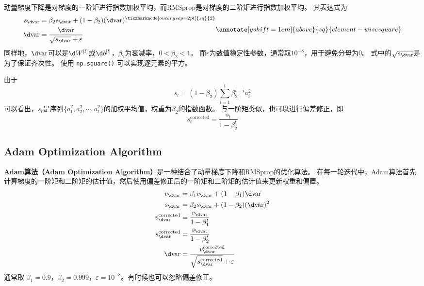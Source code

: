 动量梯度下降是对梯度的一阶矩进行指数加权平均，而RMSprop是对梯度的二阶矩进行指数加权平均。
其表达式为
\begin{equation}
    \begin{aligned}
        s_{\d \mathrm{var}} &= \beta_2 s_{\d \mathrm{var}} + (1 - \beta_2)(\d \mathrm{var})^{\tikzmarknode[outer ysep=2pt]{sq}{2}} \\
        \d \mathrm{var} &= \frac{\d \mathrm{var}}{\sqrt{s_{\d \mathrm{var}}} + \varepsilon}
    \end{aligned}
    \annotate[yshift=1em]{above}{sq}{element-wise square}
    \label{eq:rmsprop}
\end{equation}
同样地，$\d \mathrm{var}$可以是$\d W^{[l]}$或$\d b^{[l]}$，$\beta_2$为衰减率，$0 < \beta_2 < 1$。
而$\varepsilon$为数值稳定性参数，通常取$10^{-8}$，用于避免分母为0。
式中的$\sqrt{s_{\d \mathrm{var}}}$是为了保证齐次性。
使用 \verb|np.square()| 可以实现逐元素的平方。

由于
\begin{equation}
    s_t = (1 - \beta_2)\sum_{i=1}^t\beta_2^{t-i}a_i^2
\end{equation}
可以看出，$s_t$是序列$\{a_1^2, a_2^2, \cdots, a_t^2\}$的加权平均值，权重为$\beta_2$的指数函数。
与一阶矩类似，也可以进行偏差修正，即
\begin{equation}
    s_t^{\mathrm{corrected}} = \frac{s_t}{1 - \beta_2^t}
\end{equation}

\subsection{Adam Optimization Algorithm}

\textbf{Adam算法（Adam Optimization Algorithm）}是一种结合了动量梯度下降和RMSprop的优化算法。
在每一轮迭代中，Adam算法首先计算梯度的一阶矩和二阶矩的估计值，然后使用偏差修正后的一阶矩和二阶矩的估计值来更新权重和偏置。
\begin{equation}
    \begin{aligned}
        v_{\d \mathrm{var}} &= \beta_1 v_{\d \mathrm{var}} + (1 - \beta_1)\d \mathrm{var} \\
        s_{\d \mathrm{var}} &= \beta_2 s_{\d \mathrm{var}} + (1 - \beta_2)(\d \mathrm{var})^2 \\
        v_{\d \mathrm{var}}^{\mathrm{corrected}} &= \frac{v_{\d \mathrm{var}}}{1 - \beta_1^t} \\
        s_{\d \mathrm{var}}^{\mathrm{corrected}} &= \frac{s_{\d \mathrm{var}}}{1 - \beta_2^t} \\
        \d \mathrm{var} &= \frac{v_{\d \mathrm{var}}^{\mathrm{corrected}}}{\sqrt{s_{\d \mathrm{var}}^{\mathrm{corrected}}} + \varepsilon}
    \end{aligned}
\end{equation}
通常取 $\beta_1 = 0.9$，$\beta_2 = 0.999$，$\varepsilon = 10^{-8}$。有时候也可以忽略偏差修正。

